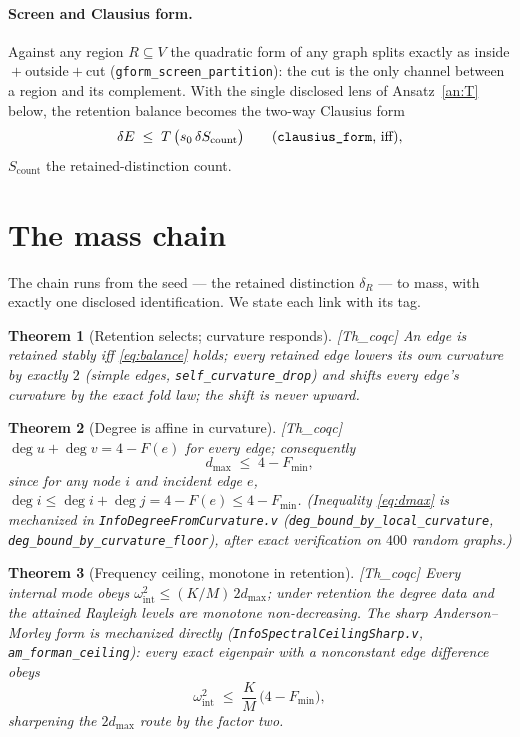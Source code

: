 \documentclass[10pt,twocolumn]{article}
\newtheorem{theorem}{Theorem}
\theoremstyle{definition}
\newcommand{\Thq}{\textsf{[Th\_coqc]}}
\newcommand{\code}[1]{\texttt{#1}}
\begin{document}
\paragraph{Screen and Clausius form.} Against any region $R\subseteq V$ the quadratic
form of any graph splits exactly as inside${}+{}$outside${}+{}$cut
(\code{gform\_screen\_partition}): the cut is the only channel between a region and its
complement. With the single disclosed lens of Ansatz~\ref{an:T} below, the retention
balance becomes the two-way Clausius form
\begin{equation}
\delta E \;\le\; T\,\bigl(s_0\,\delta S_{\mathrm{count}}\bigr)
\qquad\text{(\code{clausius\_form}, iff)},
\label{eq:clausius}
\end{equation}
$S_{\mathrm{count}}$ the retained-distinction count.

\section{The mass chain}\label{sec:mass}

The chain runs from the seed --- the retained distinction $\delta_R$ --- to mass, with
exactly one disclosed identification. We state each link with its tag.

\begin{theorem}[Retention selects; curvature responds]\label{th:link1}
\Thq{} An edge is retained stably iff \eqref{eq:balance} holds; every retained edge
lowers its own curvature by exactly $2$ (simple edges,
\code{self\_curvature\_drop}) and shifts every edge's curvature by the exact fold law;
the shift is never upward.
\end{theorem}

\begin{theorem}[Degree is affine in curvature]\label{th:link2}
\Thq{} $\deg u + \deg v = 4 - F(e)$ for every edge; consequently
\begin{equation}
d_{\max} \;\le\; 4 - F_{\min},
\label{eq:dmax}
\end{equation}
since for any node $i$ and incident edge $e$,
$\deg i \le \deg i + \deg j = 4 - F(e) \le 4 - F_{\min}$.
(Inequality \eqref{eq:dmax} is mechanized in \code{InfoDegreeFromCurvature.v}
(\code{deg\_bound\_by\_local\_curvature},
\code{deg\_bound\_by\_curvature\_floor}), after exact verification on $400$
random graphs.)
\end{theorem}

\begin{theorem}[Frequency ceiling, monotone in retention]\label{th:link3}
\Thq{} Every internal mode obeys $\omega_{\mathrm{int}}^2 \le (K/M)\,2 d_{\max}$;
under retention the degree data and the attained Rayleigh levels are monotone
non-decreasing. The sharp Anderson--Morley form is mechanized directly
(\code{InfoSpectralCeilingSharp.v}, \code{am\_forman\_ceiling}): every exact
eigenpair with a nonconstant edge difference obeys
\begin{equation}
\omega_{\mathrm{int}}^2 \;\le\; \frac{K}{M}\,\bigl(4 - F_{\min}\bigr),
\label{eq:omceil}
\end{equation}
sharpening the $2d_{\max}$ route by the factor two.
\end{theorem}
\end{document}
